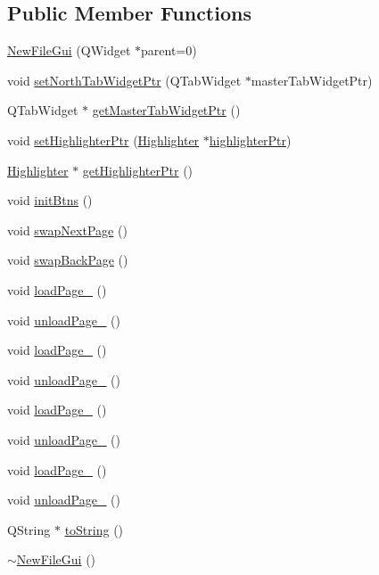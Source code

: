 \subsection*{Public Member Functions}
\begin{DoxyCompactItemize}
\item 
\hyperlink{class_new_file_gui_a090f156ef13c1915fe96cd47f6ff049d}{New\-File\-Gui} (Q\-Widget $\ast$parent=0)
\item 
void \hyperlink{class_new_file_gui_ad64da4ff0c0aa64f2045e77fbd0f50f1}{set\-North\-Tab\-Widget\-Ptr} (Q\-Tab\-Widget $\ast$master\-Tab\-Widget\-Ptr)
\item 
Q\-Tab\-Widget $\ast$ \hyperlink{class_new_file_gui_a650227edbbc789784a56b2f990697abb}{get\-Master\-Tab\-Widget\-Ptr} ()
\item 
void \hyperlink{class_new_file_gui_ac35f4e742681ccc0d52d083899b4bc85}{set\-Highlighter\-Ptr} (\hyperlink{class_highlighter}{Highlighter} $\ast$\hyperlink{class_new_file_gui_a4a63ed16985eeb14fbe35e3197420873}{highlighter\-Ptr})
\item 
\hyperlink{class_highlighter}{Highlighter} $\ast$ \hyperlink{class_new_file_gui_a51fe16ba94f7089b4b5961d30053e1f7}{get\-Highlighter\-Ptr} ()
\item 
void \hyperlink{class_new_file_gui_ad77edffa59956f16ef2b6d83dd357932}{init\-Btns} ()
\item 
void \hyperlink{class_new_file_gui_a3789c0137a7a1e6d3b9a09ebf97657c5}{swap\-Next\-Page} ()
\item 
void \hyperlink{class_new_file_gui_a19b6c2a372c842aa72b244b11fe458e7}{swap\-Back\-Page} ()
\item 
void \hyperlink{class_new_file_gui_ae279a6aa9f6e065254f02595491870bf}{load\-Page\-\_} ()
\item 
void \hyperlink{class_new_file_gui_ac5098fcfded5a9fca609eef19a777a46}{unload\-Page\-\_} ()
\item 
void \hyperlink{class_new_file_gui_a734dbe5493abf2d090b331c9b5d3ea39}{load\-Page\-\_} ()
\item 
void \hyperlink{class_new_file_gui_a38230b8cf285f610595f9e762be4a3ba}{unload\-Page\-\_} ()
\item 
void \hyperlink{class_new_file_gui_a7f61834fa8074aeefebfcb8600bba8cd}{load\-Page\-\_} ()
\item 
void \hyperlink{class_new_file_gui_a7ef65bd194d94091ff27648f765023b6}{unload\-Page\-\_} ()
\item 
void \hyperlink{class_new_file_gui_ad60fb0b561d16f76062af7e17732d318}{load\-Page\-\_} ()
\item 
void \hyperlink{class_new_file_gui_a7f604bc4692d3ebd66d00544fb1eb2de}{unload\-Page\-\_} ()
\item 
Q\-String $\ast$ \hyperlink{class_new_file_gui_a521fe1c6fd4fbbbe2b28050e77f772a1}{to\-String} ()
\item 
\hyperlink{class_new_file_gui_aaaa64713298564b96e77a199a911c27b}{$\sim$\-New\-File\-Gui} ()
\end{DoxyCompactItemize}

